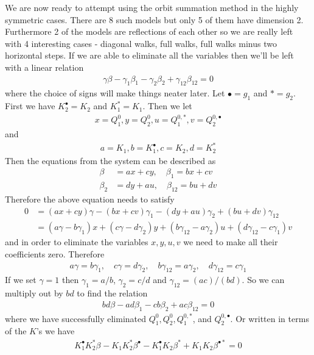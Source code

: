 We are now ready to attempt using the orbit summation method in the highly symmetric cases. There are 8 such models but only 5 of them have dimension 2. Furthermore 2 of the models are reflections of each other so we are really left with 4 interesting cases - diagonal walks, full walks, full walks minus two horizontal steps. If we are able to eliminate all the variables then we'll be left with a linear relation
\begin{align}
	\gamma \beta- \gamma_1 \beta_1-\gamma_2 \beta_2 + \gamma_{12}\beta_{12} = 0
\end{align}
where the choice of signs will make things neater later. Let $\bullet = g_1$ and $\ast = g_2$. First we have $K_2^\bullet = K_2$ and $K_1^\ast = K_1$. Then we let
\begin{align}
	x = Q_1^0, y= Q_2^0, u= Q_1^{0,\ast}, v = Q_2^{0,\bullet}
\end{align}
and
\begin{align}
	a = K_1, b = K_1^\bullet,c=K_2,d = K_2^\ast
\end{align}
Then the equations from the system can be described as
\begin{align}
	\beta &= a x + c y,\quad \beta_1 = b x + c v\\
	\beta_2 &= d y + a u,\quad \beta_{12} = b u + d v
\end{align}
Therefore the above equation needs to satisfy
\begin{align}
	0 &= (ax+cy)\gamma - (bx+cv)\gamma_1 - (dy+au)\gamma_2 + (bu +dv) \gamma_{12}\\
	   &= (a\gamma-b\gamma_1)x + (c\gamma-d\gamma_2)y + (b\gamma_{12}-a\gamma_2)u + (d\gamma_{12}-c\gamma_1)v
\end{align}
and in order to eliminate the variables $x,y,u,v$ we need to make all their coefficients zero. Therefore
\begin{align}
	a\gamma = b\gamma_1,\quad c\gamma = d\gamma_2, \quad b\gamma_{12} = a \gamma_2,\quad d\gamma_{12} = c\gamma_1
\end{align}
If we set $\gamma = 1$ then $\gamma_1 = a/b$, $\gamma_2 = c/d$ and $\gamma_{12} = (ac)/(bd)$. So we can multiply out by $bd$ to find the relation
\begin{align}
	bd\beta-ad\beta_1-cb \beta_2+ac \beta_{12} = 0
\end{align}
where we have successfully eliminated $Q_1^0, Q_2^0, Q_1^{0,\ast}$, and $  Q_2^{0,\bullet}$. Or written in terms of the $K$'s we have
\begin{align}
	K_1^{\bullet}K_2^{\ast}\beta^{}-K_1^{}K_2^{\ast}\beta^{\bullet}-K_1^{\bullet}K_2^{}\beta^{\ast}+K_1^{}K_2^{}\beta^{\bullet\ast} = 0
\end{align}
